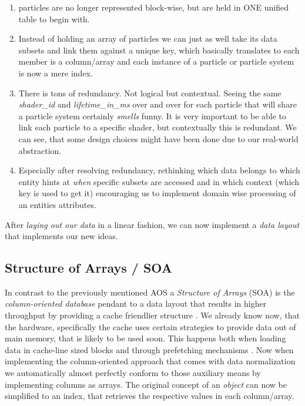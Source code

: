 \begin{enumerate}
	\item particles are no longer represented block-wise, but are held in ONE unified table to begin with.
	\item Instead of holding an array of particles we can just as well take its data subsets and link them against a unique key, which basically translates to each member is a column/array and each instance of a particle or particle system is now a mere index.
	\item There is tons of redundancy. Not logical but contextual. Seeing the same \textit{shader\_id} and \textit{lifetime\_in\_ms} over and over for each particle that will share a particle system certainly \textit{smells} funny. It is very important to be able to link each particle to a specific shader, but contextually this is redundant. We can see, that some design choices might have been done due to our real-world abstraction.
	\item Especially after resolving redundancy, rethinking which data belongs to which entity hints at \textit{when} specific subsets are accessed and in which context (which key is used to get it) encouraging us to implement domain wise processing of an entities attributes.
\end{enumerate}
After \textit{laying out our data} in a linear fashion, we can now implement a \textit{data layout} that implements our new ideas.

\subsection{Structure of Arrays / SOA}\label{soa}
In contrast to the previously mentioned AOS  a \textit{Structure of Arrays} (SOA) is the \textit{column-oriented database} pendant to a data layout that results in higher throughput by providing a cache friendlier structure . We already know now, that the hardware, specifically the cache uses certain strategies to provide data out of main memory, that is likely to be used soon. This happens both when loading data in cache-line sized blocks and through prefetching mechanisms . Now when implementing the column-oriented approach that comes with data normalization we automatically almost perfectly conform to those auxiliary means by implementing columns as arrays. The original concept of an \textit{object} can now be simplified to an index, that retrieves the respective values in each column/array.\newpage
